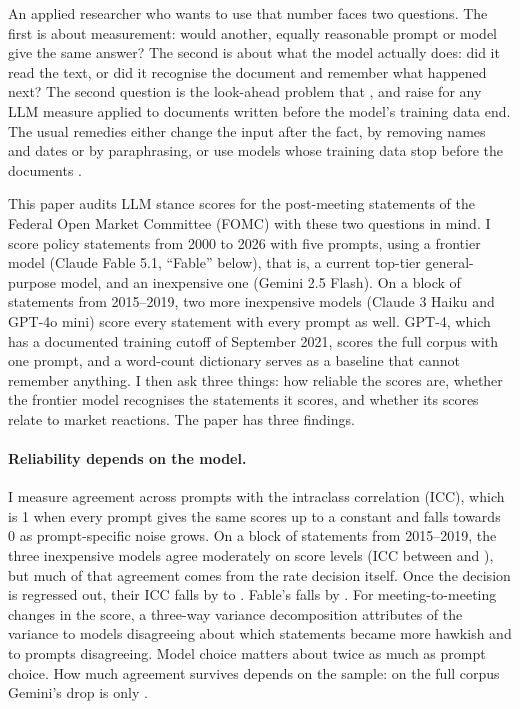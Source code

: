 \documentclass[11pt]{article}
\begin{document}
An applied researcher who wants to use that number faces two questions. The first is about measurement:
would another, equally reasonable prompt or model give the same answer? The second is about what the
model actually does: did it read the text, or did it recognise the document and remember what happened
next? The second question is the look-ahead problem that \citet{glasserman2023}, \citet{sarkar2024} and
\citet{ludwig2024} raise for any LLM measure applied to documents written before the model's training
data end. The usual remedies either change the input after the fact, by removing names and dates or by
paraphrasing, or use models whose training data stop before the documents
\citep{he2025,drinkall2024}.

This paper audits LLM stance scores for the post-meeting statements of the Federal Open Market Committee
(FOMC) with these two questions in mind. I score  policy statements from 2000 to 2026
with five prompts, using a frontier model (Claude Fable 5.1, ``Fable'' below), that is, a current
top-tier general-purpose model, and an inexpensive one (Gemini 2.5 Flash). On a block of
 statements from 2015--2019, two more inexpensive models (Claude 3 Haiku and GPT-4o mini)
score every statement with every prompt as well. GPT-4, which has a documented training cutoff of
September 2021, scores the full corpus with one prompt, and a word-count dictionary serves as a baseline
that cannot remember anything. I then ask three things: how reliable the scores are, whether the
frontier model recognises the statements it scores, and whether its scores relate to market reactions.
The paper has three findings.

\paragraph{Reliability depends on the model.} I measure agreement across prompts with the intraclass
correlation (ICC), which is 1 when every prompt gives the same scores up to a constant and falls towards 0
as prompt-specific noise grows. On a block of  statements from 2015--2019, the three
inexpensive models agree moderately on score levels (ICC between  and ),
but much of that agreement comes from the rate decision itself. Once the decision is regressed out, their ICC falls by  to .
Fable's falls by . For meeting-to-meeting changes in the score, a three-way variance
decomposition attributes  of the variance to models disagreeing about which
statements became more hawkish and  to prompts disagreeing. Model choice matters
about twice as much as prompt choice. How much agreement survives depends on the sample: on the full
corpus Gemini's drop is only .
\end{document}
